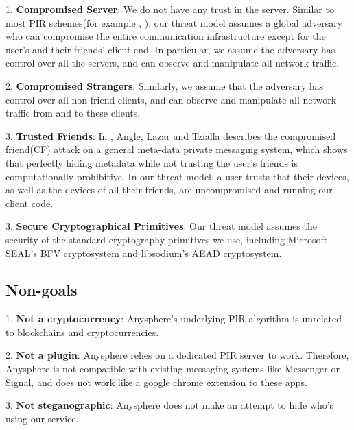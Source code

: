 


1. \textbf{Compromised Server}: We do not have any trust in the server. Similar to most PIR schemes(for example \cite{ahmad2021addra}, ), our threat model assumes a global adversary who can compromise the entire communication infrastructure except for the user's and their friends' client end. In particular, we assume the adversary has control over all the servers, and can observe and manipulate all network traffic.

2. \textbf{Compromised Strangers}: Similarly, we assume that the adversary has control over all non-friend clients, and can observe and manipulate all network traffic from and to these clients.

3. \textbf{Trusted Friends}: In \cite{angel2018s}, Angle, Lazar and Tzialla describes the compromised friend(CF) attack on a general meta-data private messaging system, which shows that perfectly hiding metadata while not trusting the user's friends is computationally prohibitive. In our threat model, a user trusts that their devices, as well as the devices of all their friends, are uncompromised and running our client code.  

3. \textbf{Secure Cryptographical Primitives}: Our threat model assumes the security of the standard cryptography primitives we use, including Microsoft SEAL's BFV cryptosystem and libsodium's AEAD cryptosystem. 



\subsection{Non-goals}
1. \textbf{Not a cryptocurrency}: Anysphere's underlying PIR algorithm is unrelated to blockchains and cryptocurrencies. 

2. \textbf{Not a plugin}: Anysphere relies on a dedicated PIR server to work. Therefore, Anysphere is not compatible with existing messaging systems like Messenger or Signal, and does not work like a google chrome extension to these apps. 

3. \textbf{Not steganographic}: Anysphere does not make an attempt to hide who's using our service.  

